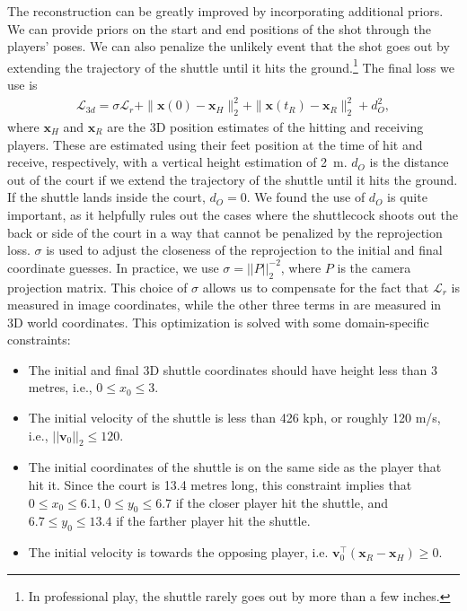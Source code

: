 The reconstruction can be greatly improved by incorporating additional priors. We can provide priors on the start and end positions of the shot through the players' poses. We can also penalize the unlikely event that the shot goes out by extending the trajectory of the shuttle until it hits the ground.\footnote{In professional play, the shuttle rarely goes out by more than a few inches.} The final loss we use is
\begin{align}
    \label{eq:final_3d_loss}
    \mathcal{L}_{3d} = \sigma \mathcal{L}_r + \|\boldsymbol{x}(0) - \boldsymbol{x}_H\|^2_2 + \|\boldsymbol{x}(t_R) -\boldsymbol{x}_R\|^2_2 + d_O^2,
\end{align}
where $\boldsymbol{x}_H$ and $\boldsymbol{x}_R$ are the 3D position estimates of the hitting and receiving players. These are estimated using their feet position at the time of hit and receive, respectively, with a vertical height estimation of \SI{2}{m}. $d_O$ is the distance out of the court if we extend the trajectory of the shuttle until it hits the ground. If the shuttle lands inside the court, $d_O = 0$. We found the use of $d_O$ is quite important, as it helpfully rules out the cases where the shuttlecock shoots out the back or side of the court in a way that cannot be penalized by the reprojection loss. $\sigma$ is used to adjust the closeness of the reprojection to the initial and final coordinate guesses. In practice, we use $\sigma = ||P||_2^{-2}$, where $P$ is the camera projection matrix. This choice of $\sigma$ allows us to compensate for the fact that $\mathcal{L}_r$ is measured in image coordinates, while the other three terms in  are measured in 3D world coordinates. This optimization is solved with some domain-specific constraints:
\begin{itemize}
    \item The initial and final 3D shuttle coordinates should have height less than 3 metres, i.e., $0 \leq x_0 \leq 3$.
    \item The initial velocity of the shuttle is less than 426 kph, or roughly 120 m/s, i.e., $||\boldsymbol{v}_0||_2 \leq 120$.
    \item The initial coordinates of the shuttle is on the same side as the player that hit it. Since the court is 13.4 metres long, this constraint implies that $0 \leq x_0 \leq 6.1$, $0 \leq y_0 \leq 6.7$ if the closer player hit the shuttle, and $6.7 \leq y_0 \leq 13.4$ if the farther player hit the shuttle.
    \item The initial velocity is towards the opposing player, i.e. $\boldsymbol{v}_0^\intercal (\boldsymbol{x}_R - \boldsymbol{x}_H) \geq  0$.
\end{itemize}

